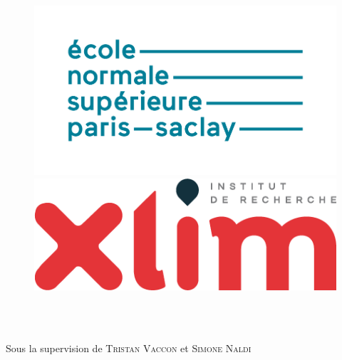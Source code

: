     
\vspace*{\fill}
    \begin{center}
        \begin{figure}[!ht]
            \begin{minipage}{0.6\textwidth}
                \includegraphics[scale=0.20]{figures/logo_ens_ps.png}
            \end{minipage}
            \begin{minipage}{0.4\textwidth}
                \includegraphics[scale=0.3]{figures/logo_xlim.png}
            \end{minipage}
        \end{figure}
    
        \makeatletter
        {\large \textbf{\@title}}
        \\
    
    
        {\textsc{\@author}}
        \\
    
        \makeatother
    
        {
            Sous la supervision de \textsc{Tristan Vaccon} et  \textsc{Simone Naldi}
        }
    \end{center}

    \vspace*{\fill}

    \newpage
